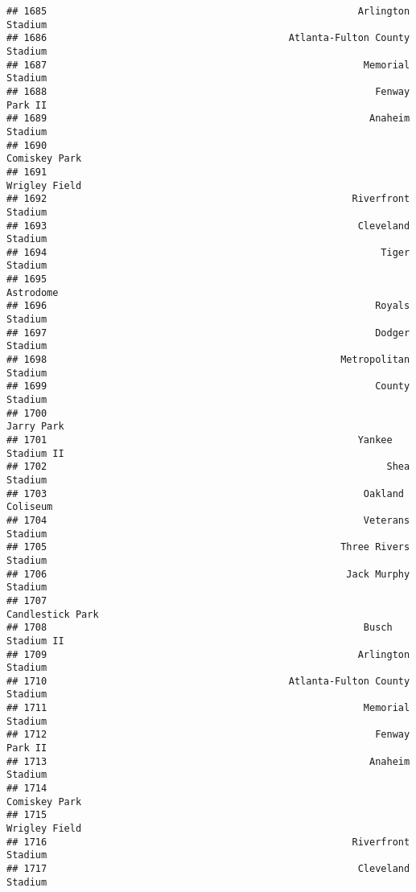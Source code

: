 \documentclass[]{article}
\begin{document}
\begin{verbatim}
## 1685                                                      Arlington Stadium
## 1686                                          Atlanta-Fulton County Stadium
## 1687                                                       Memorial Stadium
## 1688                                                         Fenway Park II
## 1689                                                        Anaheim Stadium
## 1690                                                          Comiskey Park
## 1691                                                          Wrigley Field
## 1692                                                     Riverfront Stadium
## 1693                                                      Cleveland Stadium
## 1694                                                          Tiger Stadium
## 1695                                                              Astrodome
## 1696                                                         Royals Stadium
## 1697                                                         Dodger Stadium
## 1698                                                   Metropolitan Stadium
## 1699                                                         County Stadium
## 1700                                                             Jarry Park
## 1701                                                      Yankee Stadium II
## 1702                                                           Shea Stadium
## 1703                                                       Oakland Coliseum
## 1704                                                       Veterans Stadium
## 1705                                                   Three Rivers Stadium
## 1706                                                    Jack Murphy Stadium
## 1707                                                       Candlestick Park
## 1708                                                       Busch Stadium II
## 1709                                                      Arlington Stadium
## 1710                                          Atlanta-Fulton County Stadium
## 1711                                                       Memorial Stadium
## 1712                                                         Fenway Park II
## 1713                                                        Anaheim Stadium
## 1714                                                          Comiskey Park
## 1715                                                          Wrigley Field
## 1716                                                     Riverfront Stadium
## 1717                                                      Cleveland Stadium

\end{verbatim}
\end{document}
